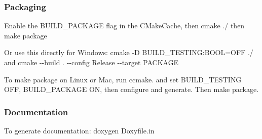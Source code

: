 \subsubsection*{Packaging}


\begin{DoxyItemize}
\item Enable the {\ttfamily B\+U\+I\+L\+D\+\_\+\+P\+A\+C\+K\+A\+GE} flag in the C\+Make\+Cache, then {\ttfamily cmake ./} then {\ttfamily make package}
\item Or use this directly for Windows\+: {\ttfamily cmake -\/D B\+U\+I\+L\+D\+\_\+\+T\+E\+S\+T\+I\+NG\+:B\+O\+OL=O\+FF ./} and {\ttfamily cmake -\/-\/build . -\/-\/config Release -\/-\/target P\+A\+C\+K\+A\+GE}
\item To make package on Linux or Mac, run {\ttfamily ccmake.} and set B\+U\+I\+L\+D\+\_\+\+T\+E\+S\+T\+I\+NG O\+FF, B\+U\+I\+L\+D\+\_\+\+P\+A\+C\+K\+A\+GE ON, then configure and generate. Then {\ttfamily make package}.
\end{DoxyItemize}

\subsubsection*{Documentation}


\begin{DoxyItemize}
\item To generate documentation\+: {\ttfamily doxygen Doxyfile.\+in} 
\end{DoxyItemize}